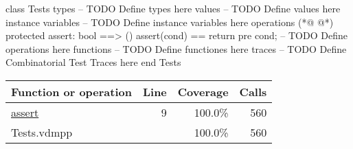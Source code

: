 \begin{vdmpp}[breaklines=true]
class Tests
types
-- TODO Define types here
values
-- TODO Define values here
instance variables
-- TODO Define instance variables here
operations
(*@
\label{assert:9}
@*)
 protected assert: bool ==> ()
 assert(cond) == return
 pre cond;
-- TODO Define operations here
functions
-- TODO Define functiones here
traces
-- TODO Define Combinatorial Test Traces here
end Tests
\end{vdmpp}
\bigskip
\begin{longtable}{|l|r|r|r|}
\hline
Function or operation & Line & Coverage & Calls \\
\hline
\hline
\hyperref[assert:9]{assert} & 9&100.0\% & 560 \\
\hline
\hline
Tests.vdmpp & & 100.0\% & 560 \\
\hline
\end{longtable}

